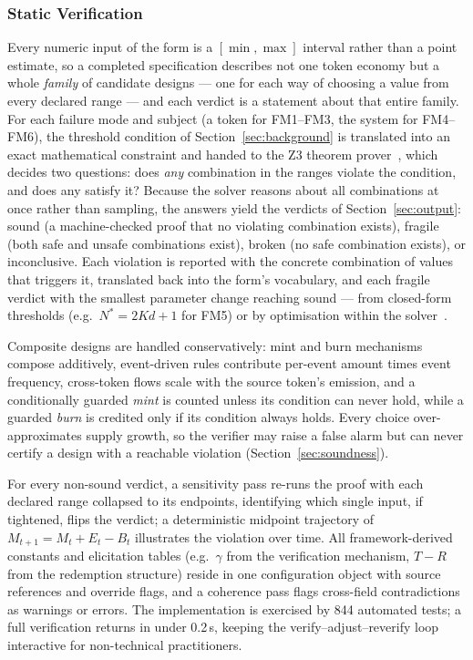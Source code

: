 \subsubsection{Static Verification}
Every numeric input of the form is a $[\min,\max]$ interval rather
than a point estimate, so a completed specification describes not one
token economy but a whole \emph{family} of candidate designs --- one
for each way of choosing a value from every declared range --- and
each verdict is a statement about that entire family. For
each failure mode and subject (a token for FM1--FM3, the system for
FM4--FM6), the threshold condition of Section~\ref{sec:background} is
translated into an exact mathematical constraint and handed to the Z3
theorem prover~\cite{deMoura2008z3}, which decides two questions:
does \emph{any} combination in the ranges violate the condition, and
does any satisfy it? Because the solver reasons about all combinations
at once rather than sampling, the answers yield the verdicts of
Section~\ref{sec:output}: \textsf{sound} (a machine-checked proof
that no violating combination exists), \textsf{fragile} (both safe
and unsafe combinations exist), \textsf{broken} (no safe combination
exists), or \textsf{inconclusive}. Each violation is reported with the
concrete combination of values that triggers it, translated back into
the form's vocabulary, and each \textsf{fragile} verdict with the
smallest parameter change reaching \textsf{sound} --- from closed-form
thresholds (e.g.\ $N^{*}=2Kd+1$ for FM5) or by optimisation within the
solver~\cite{bjorner2015nuz}.

Composite designs are handled conservatively: mint and burn mechanisms
compose additively, event-driven rules contribute per-event amount
times event frequency, cross-token flows scale with the source token's
emission, and a conditionally guarded \emph{mint} is counted unless
its condition can never hold, while a guarded \emph{burn} is credited
only if its condition always holds. Every choice over-approximates
supply growth, so the verifier may raise a false alarm but can never
certify a design with a reachable violation
(Section~\ref{sec:soundness}).

For every non-\textsf{sound} verdict, a sensitivity pass re-runs the
proof with each declared range collapsed to its endpoints, identifying
which single input, if tightened, flips the verdict; a deterministic
midpoint trajectory of $M_{t+1}=M_t+E_t-B_t$ illustrates the violation
over time. All framework-derived constants and elicitation tables
(e.g.\ $\gamma$ from the verification mechanism, $T-R$ from the
redemption structure) reside in one configuration object with source
references and override flags, and a coherence pass flags cross-field
contradictions as warnings or errors. The implementation is exercised
by 844 automated tests; a full verification returns in under 0.2\,s,
keeping the verify--adjust--reverify loop interactive for
non-technical practitioners.
